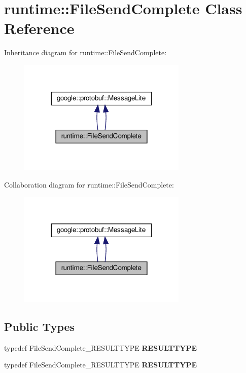 \hypertarget{classruntime_1_1FileSendComplete}{}\section{runtime\+:\+:File\+Send\+Complete Class Reference}
\label{classruntime_1_1FileSendComplete}


Inheritance diagram for runtime\+:\+:File\+Send\+Complete\+:
\nopagebreak
\begin{figure}[H]
\begin{center}
\leavevmode
\includegraphics[width=228pt]{classruntime_1_1FileSendComplete__inherit__graph}
\end{center}
\end{figure}


Collaboration diagram for runtime\+:\+:File\+Send\+Complete\+:
\nopagebreak
\begin{figure}[H]
\begin{center}
\leavevmode
\includegraphics[width=228pt]{classruntime_1_1FileSendComplete__coll__graph}
\end{center}
\end{figure}
\subsection*{Public Types}
\begin{DoxyCompactItemize}
\item 
\mbox{\label{classruntime_1_1FileSendComplete_adc4d8e1e94f8f1e2574d5c25b93f99e1}} 
typedef File\+Send\+Complete\+\_\+\+R\+E\+S\+U\+L\+T\+T\+Y\+PE {\bfseries R\+E\+S\+U\+L\+T\+T\+Y\+PE}
\item 
\mbox{\label{classruntime_1_1FileSendComplete_adc4d8e1e94f8f1e2574d5c25b93f99e1}} 
typedef File\+Send\+Complete\+\_\+\+R\+E\+S\+U\+L\+T\+T\+Y\+PE {\bfseries R\+E\+S\+U\+L\+T\+T\+Y\+PE}
\end{DoxyCompactItemize}
